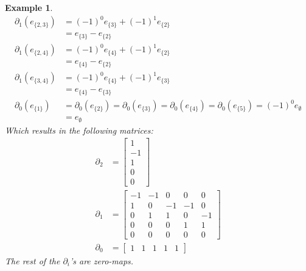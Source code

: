 \documentclass[11pt,a4paper,twoside]{report}
\newtheorem{myex}[mythm]{Example}
\begin{document}
\begin{myex}
\begin{align*}
\partial_1(e_{\{2,3\}})&=(-1)^0e_{\{3\}}+(-1)^1e_{\{2\}}\\
&=e_{\{3\}}-e_{\{2\}}\\
\partial_1(e_{\{2,4\}})&=(-1)^0e_{\{4\}}+(-1)^1e_{\{2\}}\\
&=e_{\{4\}}-e_{\{2\}}\\
\partial_1(e_{\{3,4\}})&=(-1)^0e_{\{4\}}+(-1)^1e_{\{3\}}\\
&=e_{\{4\}}-e_{\{3\}}\\
\partial_0(e_{\{1\}})&=\partial_0(e_{\{2\}})=\partial_0(e_{\{3\}})=\partial_0(e_{\{4\}})=\partial_0(e_{\{5\}})=(-1)^0e_{\emptyset}\\
&=e_{\emptyset}
\end{align*}
Which results in the following matrices:
\begin{align*}
\partial_2&=
\begin{bmatrix}
1\\
-1\\
1\\
0\\
0
\end{bmatrix}\\
\partial_1&=
\begin{bmatrix}
-1 & -1 & 0 & 0 & 0\\
1 & 0 & -1 & -1 & 0\\
0 & 1 & 1 & 0 & -1\\
0 & 0 & 0 & 1 & 1\\
0 & 0 & 0 & 0 & 0
\end{bmatrix}\\
\partial_0&=
\begin{bmatrix}
1 & 1 & 1 & 1 & 1 
\end{bmatrix}
\end{align*}
The rest of the $\partial_i$'s are zero-maps.


\end{myex}
\end{document}
